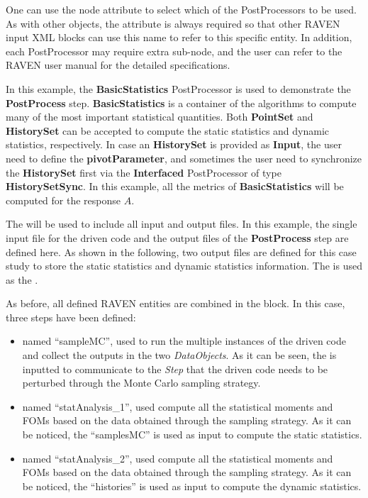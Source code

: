 One can use the node attribute  to select which of the PostProcessors to be used. As with other
objects, the attribute  is always required so that other RAVEN input XML blocks can use this name
to refer to this specific entity. In addition, each PostProcessor may require extra sub-node, and the user can refer
to the RAVEN user manual for the detailed specifications.

In this example, the \textbf{BasicStatistics} PostProcessor is used to demonstrate the \textbf{PostProcess} step.
\textbf{BasicStatistics} is a container of the algorithms to compute many of the most important statistical quantities.
Both \textbf{PointSet} and \textbf{HistorySet} can be accepted to compute the static statistics and dynamic statistics,
respectively. In case an \textbf{HistorySet} is provided as \textbf{Input}, the user need to define the \textbf{pivotParameter},
and sometimes the user need to synchronize the \textbf{HistorySet} first via the \textbf{Interfaced} PostProcessor of
type \textbf{HistorySetSync}.
In this example, all the metrics of \textbf{BasicStatistics} will be computed for the response $A$.

The  will be used to include all input and output files. In this example, the single input file
for the driven code and the output files of the \textbf{PostProcess} step are defined here. As shown in the following,
two output files are defined for this case study to store the static statistics and dynamic statistics information.
The  is used as the .


As before, all defined RAVEN entities are combined in the  block.
In this case, three steps have been defined:

\begin{itemize}
  \item {} named ``sampleMC'', used to run the multiple instances of the driven code and
     collect the outputs in the two \textit{DataObjects}. As it can be seen, the  is inputted
     to communicate to the \textit{Step} that the driven code needs to be perturbed through the Monte Carlo sampling
     strategy.
  \item {} named ``statAnalysis\_1'', used compute all the statistical moments and FOMs
    based on the data obtained through the sampling strategy. As it can be noticed, the 
    ``samplesMC'' is used as input to compute the static statistics.
  \item {} named ``statAnalysis\_2'', used compute all the statistical moments and FOMs
    based on the data obtained through the sampling strategy. As it can be noticed, the 
    ``histories'' is used as input to compute the dynamic statistics.
\end{itemize}




